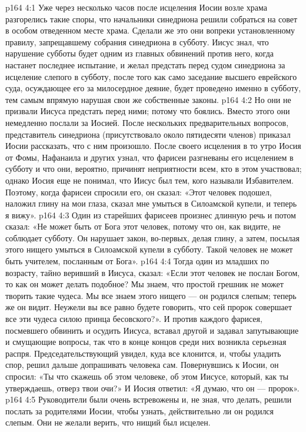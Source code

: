 \vs p164 4:1 Уже через несколько часов после исцеления Иосии возле храма разгорелись такие споры, что начальники синедриона решили собраться на совет в особом отведенном месте храма. Сделали же это они вопреки установленному правилу, запрещавшему собрания синедриона в субботу. Иисус знал, что нарушение субботы будет одним из главных обвинений против него, когда настанет последнее испытание, и желал предстать перед судом синедриона за исцеление слепого в субботу, после того как само заседание высшего еврейского суда, осуждающее его за милосердное деяние, будет проведено именно в субботу, тем самым впрямую нарушая свои же собственные законы.
\vs p164 4:2 Но они не призвали Иисуса предстать перед ними; потому что боялись. Вместо этого они немедленно послали за Иосией. После нескольких предварительных вопросов, представитель синедриона (присутствовало около пятидесяти членов) приказал Иосии рассказать, что с ним произошло. После своего исцеления в то утро Иосия от Фомы, Нафанаила и других узнал, что фарисеи разгневаны его исцелением в субботу и что они, вероятно, причинят неприятности всем, кто в этом участвовал; однако Иосия еще не понимал, что Иисус был тем, кого называли Избавителем. Поэтому, когда фарисеи спросили его, он сказал: «Этот человек подошел, наложил глину на мои глаза, сказал мне умыться в Силоамской купели, и теперь я вижу».
\vs p164 4:3 Один из старейших фарисеев произнес длинную речь и потом сказал: «Не может быть от Бога этот человек, потому что он, как видите, не соблюдает субботу. Он нарушает закон, во\hyp{}первых, делая глину, а затем, посылая этого нищего умыться в Силоамской купели в субботу. Такой человек не может быть учителем, посланным от Бога».
\vs p164 4:4 Тогда один из младших по возрасту, тайно веривший в Иисуса, сказал: «Если этот человек не послан Богом, то как он может делать подобное? Мы знаем, что простой грешник не может творить такие чудеса. Мы все знаем этого нищего --- он родился слепым; теперь же он видит. Неужели вы все равно будете говорить, что сей пророк совершает все эти чудеса силою принца бесовского?». И против каждого фарисея, посмевшего обвинить и осудить Иисуса, вставал другой и задавал запутывающие и смущающие вопросы, так что в конце концов среди них возникла серьезная распря. Председательствующий увидел, куда все клонится, и, чтобы уладить спор, решил дальше допрашивать человека сам. Повернувшись к Иосии, он спросил: «Ты что скажешь об этом человеке, об этом Иисусе, который, как ты утверждаешь, отверз твои очи?» И Иосия ответил: «Я думаю, что он --- пророк».
\vs p164 4:5 Руководители были очень встревожены и, не зная, что делать, решили послать за родителями Иосии, чтобы узнать, действительно ли он родился слепым. Они не желали верить, что нищий был исцелен.
